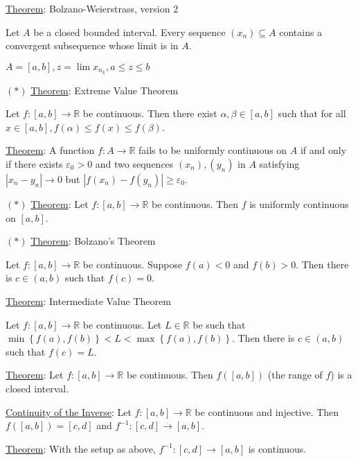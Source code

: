 \documentclass[12pt]{article}
\newcommand{\RR}{\mathbb{R}} %
\newcommand\set[1]{\left\lbrace #1 \right\rbrace} %
\newcommand\abs[1]{\left| #1 \right|} %
\newcommand{\eps}{\varepsilon}
\begin{document}
\underline{Theorem}: Bolzano-Weierstrass, version 2

Let $A$ be a closed bounded interval. Every sequence $(x_n) \subseteq A$ contains a convergent subsequence whose limit is in $A$.

$A = [a, b], z = \lim x_{n_k}, a \le z \le b$

\hrulefill

$(\ast)$ \underline{Theorem}: Extreme Value Theorem

Let $f : [a, b] \rightarrow \RR$ be continuous. Then there exist $\alpha, \beta \in [a, b]$ such that for all $x \in [a, b], f(\alpha) \le f(x) \le f(\beta)$.

\hrulefill

\underline{Theorem}: A function $f : A \rightarrow \RR$ fails to be uniformly continuous on $A$ if and only if there exists $\eps_0 > 0$ and two sequences $(x_n), (y_n)$ in $A$ satisfying $\abs{x_n - y_n} \rightarrow 0$ but $\abs{f(x_n) - f(y_n)} \ge \eps_0$.

\hrulefill

$(\ast)$ \underline {Theorem}: Let $f : [a, b] \rightarrow \RR$ be continuous. Then $f$ is uniformly continuous on $[a, b]$.

\hrulefill

$(\ast)$ \underline{Theorem}: Bolzano's Theorem

Let $f : [a, b] \rightarrow \RR$ be continuous. Suppose $f(a) < 0$ and $f(b) > 0$. Then there is $c \in (a, b)$ such that $f(c) = 0$.

\hrulefill

\underline{Theorem}: Intermediate Value Theorem

Let $f : [a, b] \rightarrow \RR$ be continuous. Let $L \in \RR$ be such that $\min \set{f(a), f(b)} < L < \max \set{f(a), f(b)}$. Then there is $c \in (a, b)$ such that $f(c) = L$.

\hrulefill

\underline{Theorem}: Let $f : [a, b] \rightarrow \RR$ be continuous. Then $f([a, b])$ (the range of $f$) is a closed interval.

\hrulefill

\underline{Continuity of the Inverse}: Let $f : [a, b] \rightarrow \RR$ be continuous and injective. Then $f([a, b]) = [c, d]$ and $f^{-1} : [c, d] \rightarrow [a, b]$.

\underline{Theorem}: With the setup as above, $f^{-1} : [c, d] \rightarrow [a, b]$ is continuous.

\pagebreak
\end{document}
